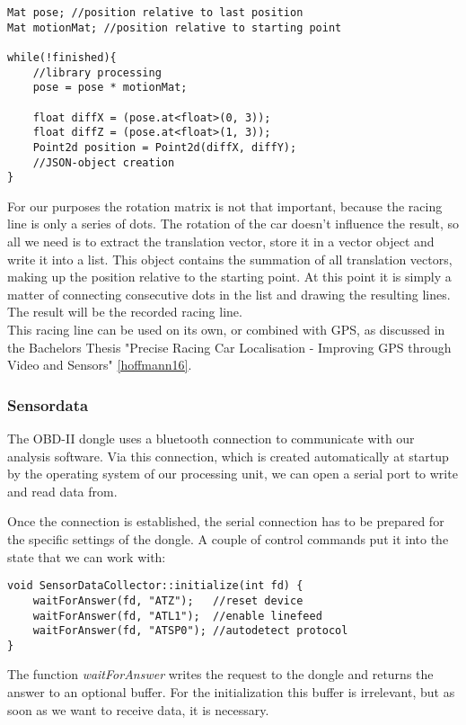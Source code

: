 \begin{lstlisting}
Mat pose; //position relative to last position
Mat motionMat; //position relative to starting point

while(!finished){
	//library processing
	pose = pose * motionMat;

	float diffX = (pose.at<float>(0, 3));
	float diffZ = (pose.at<float>(1, 3));
	Point2d position = Point2d(diffX, diffY);
	//JSON-object creation 
}
\end{lstlisting}

For our purposes the rotation matrix is not that important, because the racing line is only a series of dots. The rotation of the car doesn't influence the result, so all we need is to extract the translation vector, store it in a vector object and write it into a list. This object contains the summation of all translation vectors, making up the position relative to the starting point.
At this point it is simply a matter of connecting consecutive dots in the list and drawing the resulting lines. The result will be the recorded racing line.\\
This racing line can be used on its own, or combined with GPS, as discussed in the Bachelors Thesis "Precise Racing Car Localisation - Improving GPS through Video and Sensors" \ref{hoffmann16}.

\subsubsection{Sensordata}
The OBD-II dongle uses a bluetooth connection to communicate with our analysis software. Via this connection, which is created automatically at startup by the operating system of our processing unit, we can open a serial port to write and read data from.

Once the connection is established, the serial connection has to be prepared for the specific settings of the dongle.
A couple of control commands put it into the state that we can work with: 

\begin{lstlisting}
void SensorDataCollector::initialize(int fd) {
	waitForAnswer(fd, "ATZ");	//reset device
	waitForAnswer(fd, "ATL1");	//enable linefeed
	waitForAnswer(fd, "ATSP0");	//autodetect protocol
}
\end{lstlisting}

The function \textit{waitForAnswer} writes the request to the dongle and returns the answer to an optional buffer. For the initialization this buffer is irrelevant, but as soon as we want to receive data, it is necessary.

